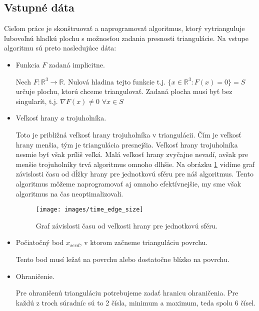 \subsection{Vstupné dáta}
\label{kap:input_data}
Cieľom práce je skonštruovať a naprogramovať algoritmus, ktorý vytrianguluje ľubovoľnú hladkú plochu s 
možnosťou zadania presnosti triangulácie. Na vstupe algoritmu sú preto nasledujúce dáta:
\begin{itemize}
    \item{
        Funkcia $F$ zadaná implicitne.
        
        Nech $F:\mathbb{R}^3 \to \mathbb{R}$.
        Nulová hladina tejto funkcie t.j. $\{x \in \mathbb{R}^3 : F(x) = 0\} = S$ určuje plochu, 
        ktorú chceme triangulovať. 
        Zadaná plocha musí byť bez singularít, t.j. $\nabla F(x) \neq 0 \,\, \forall x \in S$
    }
    \item{
        Veľkosť hrany $a$ trojuholníka.

        Toto je približná veľkosť hrany trojuholníka v triangulácii. 
        Čím je veľkosť hrany menšia, tým je triangulácia presnejšia. Veľkosť hrany trojuholníka 
        nesmie byť však príliš veľká. Malá veľkosť hrany zvyčajne nevadí, avšak pre 
        menšie trojuholníky trvá algoritmus omnoho dlhšie. Na obrázku \ref{obr:time_edge_size}
        vidíme graf závislosti času od dĺžky hrany pre jednotkovú sféru pre náš algoritmus. 
        Tento algoritmus môžeme
        naprogramovať aj omnoho efektívnejšie, my sme však algoritmus na čas neoptimalizovali.

        \begin{figure}
            \centerline{\texttt{[image: images/time\_edge\_size]}}
            \caption[Graf závislosti času od veľkosti hrany]{Graf závislosti času od veľkosti hrany pre jednotkovú sféru.}
            \label{obr:time_edge_size}
        \end{figure}
    }
    \item{
        Počiatočný bod $x_{seed}$, v ktorom začneme trianguláciu povrchu. 

        Tento bod musí ležať na povrchu alebo dostatočne blízko na povrchu.
    }
    \item{
        Ohraničenie.

        Pre ohraničenú trianguláciu potrebujeme zadať hranicu ohraničenia. Pre každú z troch súradníc 
        sú to 2 čísla, minimum a maximum, teda spolu 6 čísel.
    }
\end{itemize}

